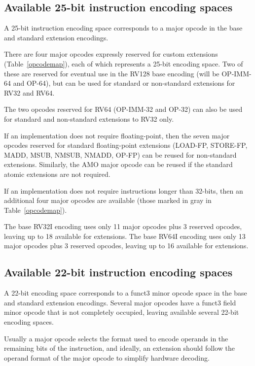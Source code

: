 \subsection*{Available 25-bit instruction encoding spaces}

A 25-bit instruction encoding space corresponds to a major opcode in
the base and standard extension encodings.

There are four major opcodes expressly reserved for custom extensions
(Table~\ref{opcodemap}), each of which represents a 25-bit encoding
space.  Two of these are reserved for eventual use in the RV128 base
encoding (will be OP-IMM-64 and OP-64), but can be used for standard
or non-standard extensions for RV32 and RV64.

The two opcodes reserved for RV64 (OP-IMM-32 and OP-32) can also be
used for standard and non-standard extensions to RV32 only.

If an implementation does not require floating-point, then the seven
major opcodes reserved for standard floating-point extensions
(LOAD-FP, STORE-FP, MADD, MSUB, NMSUB, NMADD, OP-FP) can be reused for
non-standard extensions.  Similarly, the AMO major opcode can be
reused if the standard atomic extensions are not required.

If an implementation does not require instructions longer than
32-bits, then an additional four major opcodes are available (those
marked in gray in Table~\ref{opcodemap}).

The base RV32I encoding uses only 11 major opcodes plus 3 reserved
opcodes, leaving up to 18 available for extensions.  The base RV64I
encoding uses only 13 major opcodes plus 3 reserved opcodes, leaving
up to 16 available for extensions.

\subsection*{Available 22-bit instruction encoding spaces}

A 22-bit encoding space corresponds to a funct3 minor opcode space in
the base and standard extension encodings.  Several major opcodes have
a funct3 field minor opcode that is not completely occupied, leaving
available several 22-bit encoding spaces.

Usually a major opcode selects the format used to encode operands in
the remaining bits of the instruction, and ideally, an extension
should follow the operand format of the major opcode to simplify
hardware decoding.

